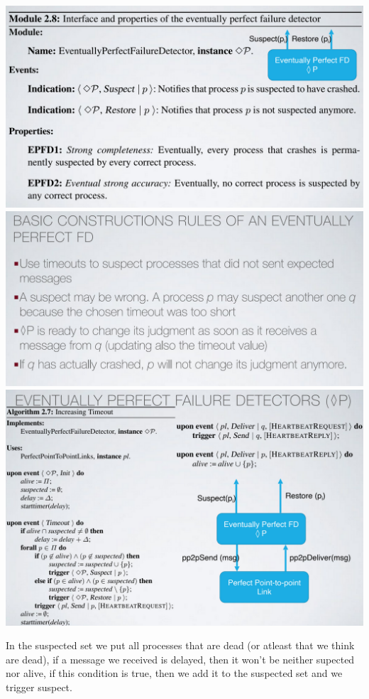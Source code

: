 \documentclass[11pt, a4paper]{article}
\begin{document}
\begin{center}
    \includegraphics[scale=0.5]{img/FD/DiamondPPropertiers.png}
    \includegraphics[scale=0.5]{img/FD/BasicsDiamond.png}
    \includegraphics[scale=0.5]{img/FD/DiamondPAlgo.png}
\end{center}
In the suspected set we put all processes that are dead (or atleast that we think are dead), if a message we received is delayed, then it won't be neither supected nor alive, if this condition is true, then we add it to the suspected set and we trigger suspect.
\end{document}
